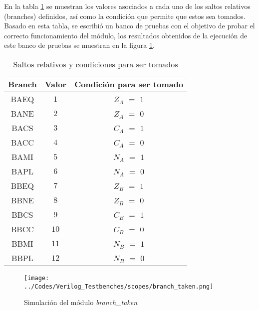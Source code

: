 En la tabla \ref{t:saltos} se muestran los valores asociados a cada uno de los saltos relativos (branches) definidos, as\'i como la condici\'on que permite que estos sea tomados. Basado en esta tabla, se escribi\'o un banco de pruebas con el objetivo de probar el correcto funcionamiento del m\'odulo, los resultados obtenidos de la ejecuci\'on de este banco de pruebas se muestran en la figura \ref{f:branch_taken_results}.\\

\begin{table}[h!]
\centering
\caption{Saltos relativos y condiciones para ser tomados}
\label{t:saltos}
\begin{tabular}{|c|c|c|}
\hline
{\bf Branch} & {\bf Valor} & {\bf Condici\'on para ser tomado} \\ \hline
BAEQ         & $1$         & $Z_{A}$ $=$ $1$                   \\ \hline
BANE         & $2$         & $Z_{A}$ $=$ $0$                   \\ \hline
BACS         & $3$         & $C_{A}$ $=$ $1$                   \\ \hline
BACC         & $4$         & $C_{A}$ $=$ $0$                   \\ \hline
BAMI         & $5$         & $N_{A}$ $=$ $1$                   \\ \hline
BAPL         & $6$         & $N_{A}$ $=$ $0$                   \\ \hline
BBEQ         & $7$         & $Z_{B}$ $=$ $1$                   \\ \hline
BBNE         & $8$         & $Z_{B}$ $=$ $0$                   \\ \hline
BBCS         & $9$         & $C_{B}$ $=$ $1$                   \\ \hline
BBCC         & $10$        & $C_{B}$ $=$ $0$                   \\ \hline
BBMI         & $11$        & $N_{B}$ $=$ $1$                   \\ \hline
BBPL         & $12$        & $N_{B}$ $=$ $0$                   \\ \hline
\end{tabular}
\end{table}

\begin{figure}[hbtp]
\caption{Simulaci\' on del m\'odulo \textit{branch\_taken}}
\centering
\texttt{[image: ../Codes/Verilog\_Testbenches/scopes/branch\_taken.png]}
\label{f:branch_taken_results}
\end{figure}

